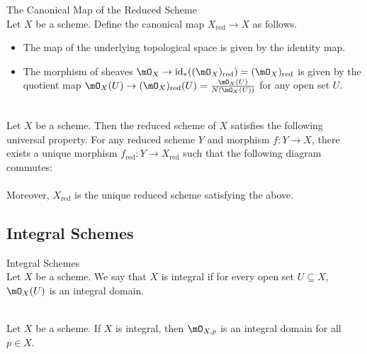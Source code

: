 \documentclass[a4paper]{article}
\begin{document}
\begin{defn}{The Canonical Map of the Reduced Scheme}{}\\
Let $X$ be a scheme. Define the canonical map $X_\text{red}\to X$ as follows. 
\begin{itemize}
\item The map of the underlying topological space is given by the identity map. 
\item The morphism of sheaves $\mO_X\to\text{id}_\ast((\mO_X)_\text{red})=(\mO_X)_\text{red}$ is given by the quotient map $\mO_X(U)\to(\mO_X)_\text{red}(U)=\frac{\mO_X(U)}{N(\mO_X(U))}$ for any open set $U$. 
\end{itemize}
\end{defn}

\begin{prp}{}{}\\
Let $X$ be a scheme. Then the reduced scheme of $X$ satisfies the following universal property. For any reduced scheme $Y$ and morphism $f:Y\to X$, there exists a unique morphism $f_\text{red}:Y\to X_\text{red}$ such that the following diagram commutes: \\
\\
Moreover, $X_\text{red}$ is the unique reduced scheme satisfying the above. 
\end{prp}

\subsection{Integral Schemes}
\begin{defn}{Integral Schemes}{}\\
Let $X$ be a scheme. We say that $X$ is integral if for every open set $U\subseteq X$, $\mO_X(U)$ is an integral domain. 
\end{defn}

\begin{lmm}{}{}\\
Let $X$ be a scheme. If $X$ is integral, then $\mO_{X,p}$ is an integral domain for all $p\in X$. 
\end{lmm}
\end{document}
